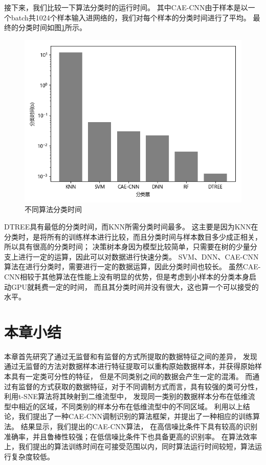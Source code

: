 接下来，我们比较一下算法分类时的运行时间。
其中CAE-CNN由于样本是以一个batch共1024个样本输入进网络的，我们对每个样本的分类时间进行了平均。
最终的分类时间如图\ref{sec:fig_3_13}所示。\par
\begin{figure}[!h]
	\centering
	\includegraphics[scale=0.65]{figures/chapter_3/fig_3_13}
	\caption{不同算法分类时间}	\label{sec:fig_3_13}
\end{figure}
DTREE具有最低的分类时间，而KNN所需分类时间最多。
这主要是因为KNN在分类时，是将所有的训练样本进行比较，而且分类时间与样本数目多少成正相关，所以具有很高的分类时间；
决策树本身因为模型比较简单，只需要在树的少量分支上进行一定的运算，因此可以对数据进行快速分类。
SVM、DNN、CAE-CNN算法在进行分类时，需要进行一定的数据运算，因此分类时间也较长。
虽然CAE-CNN相较于其他算法在性能上没有明显的优势，但是考虑到小样本的分类本身启动GPU就耗费一定的时间，
而且其分类时间并没有很大，这也算一个可以接受的水平。
\par

\section{本章小结}

本章首先研究了通过无监督和有监督的方式所提取的数据特征之间的差异，
发现通过无监督的方法对数据样本进行特征提取可以重构原始数据样本，并获得原始样本具有一定类可分性的特征，
但是不同类别之间的数据会产生一定的混淆。
而通过有监督的方式获取的数据特征，对于不同调制方式而言，具有较强的类可分性，利用t-SNE算法将其映射到二维流型中，
发现同一类别的数据样本分布在低维流型中相近的区域，不同类别的样本分布在低维流型中的不同区域。
利用以上结论，我们提出了一种CAE-CNN调制识别的算法框架，并提出了一种相应的训练算法。
结果显示，我们提出的CAE-CNN算法，
在高信噪比条件下具有较高的识别准确率，并且鲁棒性较强；在低信噪比条件下也具备更高的识别率。
在算法效率上，我们提出的算法训练时间在可接受范围以内，同时算法运行时间较短，算法运行复杂度较低。\par

